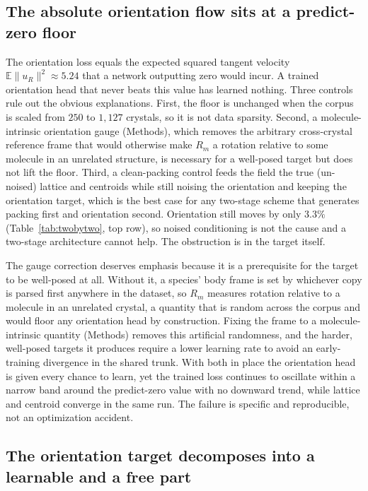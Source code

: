 \documentclass[11pt]{article}
\begin{document}
\subsection{The absolute orientation flow sits at a predict-zero floor}

The orientation loss equals the expected squared tangent velocity
$\mathbb{E}\lVert u_R\rVert^2\approx 5.24$ that a network outputting zero would
incur. A trained orientation head that never beats this value has learned
nothing. Three controls rule out the obvious explanations. First, the floor is
unchanged when the corpus is scaled from $250$ to $1{,}127$ crystals, so it is
not data sparsity. Second, a molecule-intrinsic orientation gauge (Methods),
which removes the arbitrary cross-crystal reference frame that would otherwise
make $R_m$ a rotation relative to some molecule in an unrelated structure, is
necessary for a well-posed target but does not lift the floor. Third, a
clean-packing control feeds the field the true (un-noised) lattice and
centroids while still noising the orientation and keeping the orientation
target, which is the best case for any two-stage scheme that generates packing
first and orientation second. Orientation still moves by only $3.3\%$
(Table~\ref{tab:twobytwo}, top row), so noised conditioning is not the cause and
a two-stage architecture cannot help. The obstruction is in the target itself.

The gauge correction deserves emphasis because it is a prerequisite for the
target to be well-posed at all. Without it, a species' body frame is set by
whichever copy is parsed first anywhere in the dataset, so $R_m$ measures
rotation relative to a molecule in an unrelated crystal, a quantity that is
random across the corpus and would floor any orientation head by construction.
Fixing the frame to a molecule-intrinsic quantity (Methods) removes this
artificial randomness, and the harder, well-posed targets it produces require a
lower learning rate to avoid an early-training divergence in the shared trunk.
With both in place the orientation head is given every chance to learn, yet the
trained loss continues to oscillate within a narrow band around the
predict-zero value with no downward trend, while lattice and centroid converge
in the same run. The failure is specific and reproducible, not an optimization
accident.

\subsection{The orientation target decomposes into a learnable and a free part}
\end{document}
